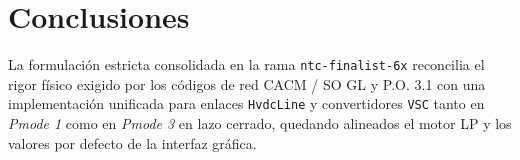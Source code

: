 \documentclass[11pt,a4paper]{article}
\begin{document}
\section{Conclusiones}
La formulación estricta consolidada en la rama \texttt{ntc-finalist-6x} reconcilia el rigor físico exigido por los códigos de red CACM / SO GL y P.O. 3.1 con una implementación unificada para enlaces \texttt{HvdcLine} y convertidores \texttt{VSC} tanto en \textit{Pmode 1} como en \textit{Pmode 3} en lazo cerrado, quedando alineados el motor LP y los valores por defecto de la interfaz gráfica.
\end{document}
